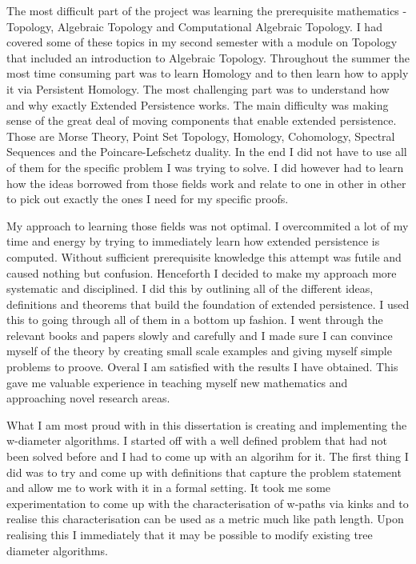 The most difficult part of the project was learning the prerequisite mathematics - Topology, Algebraic Topology and Computational Algebraic Topology. I had covered some of these topics in my second semester with a module on Topology that included an introduction to Algebraic Topology. Throughout the summer the most time consuming part was to learn Homology and to then learn how to apply it via Persistent Homology. The most challenging part was to understand how and why exactly Extended Persistence works. The main difficulty was making sense of the great deal of moving components that enable extended persistence. Those are Morse Theory, Point Set Topology, Homology, Cohomology, Spectral Sequences and the Poincare-Lefschetz duality. In the end I did not have to use all of them for the specific problem I was trying to solve. I did however had to learn how the ideas borrowed from those fields work and relate to one in other in other to pick out exactly the ones I need for my specific proofs.

My approach to learning those fields was not optimal. I overcommited a lot of my time and energy by trying to immediately learn how extended persistence is computed. Without sufficient prerequisite knowledge this attempt was futile and caused nothing but confusion. Henceforth I decided to make my approach more systematic and disciplined. I did this by outlining all of the different ideas, definitions and theorems that build the foundation of extended persistence. I used this to going through all of them in a bottom up fashion. I went through the relevant books and papers slowly and carefully and I made sure I can convince myself of the theory by creating small scale examples and giving myself simple problems to proove. Overal I am satisfied with the results I have obtained. This gave me valuable experience in teaching myself new mathematics and approaching novel research areas.

What I am most proud with in this dissertation is creating and implementing the w-diameter algorithms. I started off with a well defined problem that had not been solved before and I had to come up with an algorihm for it. The first thing I did was to try and come up with definitions that capture the problem statement and allow me to work with it in a formal setting. It took me some experimentation to come up with the characterisation of w-paths via kinks and to realise this characterisation can be used as a metric much like path length. Upon realising this I immediately that it may be possible to modify existing tree diameter algorithms.



